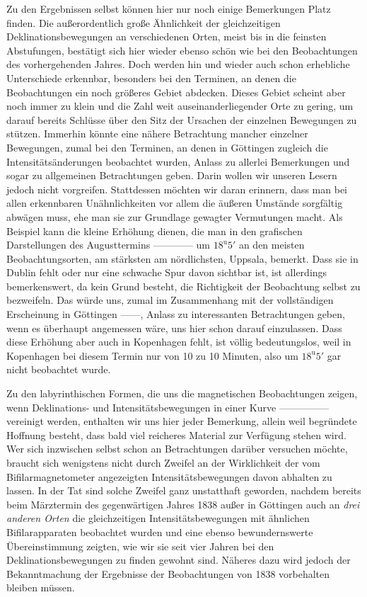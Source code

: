 Zu den Ergebnissen selbst können hier nur noch einige Bemerkungen Platz finden. Die außerordentlich große Ähnlichkeit der gleichzeitigen Deklinationsbewegungen an verschiedenen Orten, meist bis in die feinsten Abstufungen, bestätigt sich hier wieder ebenso schön wie bei den Beobachtungen des vorhergehenden Jahres. Doch werden hin und wieder auch schon erhebliche Unterschiede erkennbar, besonders bei den Terminen, an denen die Beobachtungen ein noch größeres Gebiet abdecken. Dieses Gebiet scheint aber noch immer zu klein und die Zahl weit auseinanderliegender Orte zu gering, um darauf bereits Schlüsse über den Sitz der Ursachen der einzelnen Bewegungen zu stützen. Immerhin könnte eine nähere Betrachtung mancher einzelner Bewegungen, zumal bei den Terminen, an denen in Göttingen zugleich die Intensitätsänderungen beobachtet wurden,
Anlass zu allerlei Bemerkungen und sogar zu allgemeinen Betrachtungen geben. Darin wollen wir unseren Lesern jedoch nicht vorgreifen. Stattdessen möchten wir daran erinnern, dass man bei allen erkennbaren Unähnlichkeiten vor allem die äußeren Umstände sorgfältig abwägen muss, ehe man sie zur Grundlage gewagter Vermutungen macht. Als Beispiel kann die kleine Erhöhung dienen, die man in den grafischen Darstellungen des Augusttermins ---\quad---\quad---\quad--- um $18^{\mathrm u}5'$ an den meisten Beobachtungsorten, am stärksten am nördlichsten, Uppsala, bemerkt. Dass sie in Dublin fehlt oder nur eine schwache Spur davon sichtbar ist, ist allerdings bemerkenswert, da kein Grund besteht, die Richtigkeit der Beobachtung selbst zu bezweifeln. Das würde uns, zumal im Zusammenhang mit der vollständigen Erscheinung in Göttingen ---\quad---, Anlass zu interessanten Betrachtungen geben, wenn es überhaupt angemessen wäre, uns hier schon darauf einzulassen. Dass diese Erhöhung aber auch in Kopenhagen fehlt, ist völlig bedeutungslos, weil in Kopenhagen bei diesem Termin nur von 10 zu 10 Minuten, also um $18^{\mathrm u}5'$ gar nicht beobachtet wurde.

Zu den labyrinthischen Formen, die uns die magnetischen Beobachtungen zeigen, wenn Deklinations- und Intensitätsbewegungen in einer Kurve ---\quad---\quad---\quad---\quad--- vereinigt werden, enthalten wir uns hier jeder Bemerkung, allein weil begründete Hoffnung besteht, dass bald viel reicheres Material zur Verfügung stehen wird. Wer sich inzwischen selbst schon an Betrachtungen darüber versuchen möchte, braucht sich wenigstens nicht durch Zweifel an der Wirklichkeit der vom Bifilarmagnetometer angezeigten Intensitätsbewegungen davon abhalten zu lassen. In der Tat sind solche Zweifel ganz unstatthaft geworden, nachdem bereits beim Märztermin des gegenwärtigen Jahres 1838 außer in Göttingen auch an \textit{drei anderen Orten} die gleichzeitigen Intensitätsbewegungen mit ähnlichen Bifilarapparaten beobachtet wurden und eine ebenso bewundernswerte Übereinstimmung zeigten, wie wir sie seit vier Jahren bei den Deklinationsbewegungen zu finden gewohnt sind. Näheres dazu wird jedoch der Bekanntmachung der Ergebnisse der Beobachtungen von 1838 vorbehalten bleiben müssen.

